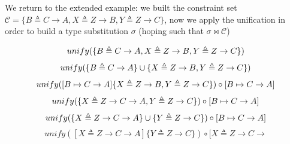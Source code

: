 \documentclass[8pt]{beamer}
\begin{document}
\begin{frame}
    We return to the extended example: we built the constraint set
    $\mathcal{C} = \{B\triangleq C\rightarrow A, X 
                        \triangleq  Z \rightarrow B, Y \triangleq  Z
                        \rightarrow C\}$, now we apply the unification
                        in order to build a type substitution $\sigma$
                        (hoping such that $\sigma \Join \mathcal{C}$)
    \begin{overprint}
    \begin{displaymath}
             unify(\{B\triangleq C\rightarrow A,X 
                                \triangleq  Z \rightarrow B, Y
                                \triangleq  Z \rightarrow C\}) \\
    \end{displaymath}
    \begin{displaymath}
             unify(\{B\triangleq C\rightarrow A\} \cup \{X 
                                \triangleq  Z \rightarrow B, Y
                                \triangleq  Z \rightarrow C\}) \\
    \end{displaymath}
    \begin{displaymath}
             unify([B\mapsto C\rightarrow A]\{X \triangleq  Z \rightarrow B, Y
                                \triangleq  Z \rightarrow
                                C\})\circ[B\mapsto C\rightarrow A]\\
    \end{displaymath}
    \begin{displaymath}
             unify(\{ X \triangleq  Z \rightarrow C\rightarrow A, Y
                                \triangleq  Z \rightarrow
                                C\})\circ[B\mapsto C\rightarrow A]\\
    \end{displaymath}
    \begin{displaymath}
             unify(\{ X \triangleq  Z \rightarrow C\rightarrow
                A\}\cup\{ Y \triangleq  Z \rightarrow
                                C\})\circ[B\mapsto C\rightarrow A]\\
    \end{displaymath}
    \begin{displaymath}
             unify([ X \triangleq  Z \rightarrow C\rightarrow
                A]\{ Y \triangleq  Z \rightarrow
                    C\})\circ[ X \triangleq  Z \rightarrow C\rightarrow

\end{displaymath}
\end{overprint}
\end{frame}
\end{document}
